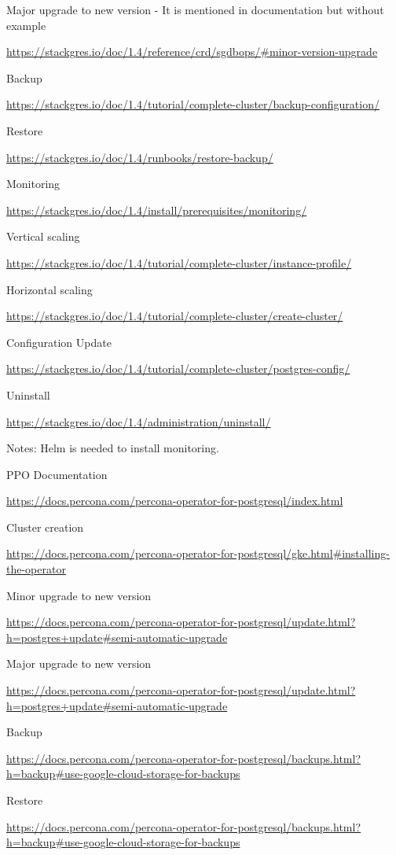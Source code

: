 Major upgrade to new version - It is mentioned in documentation but without example

\url{https://stackgres.io/doc/1.4/reference/crd/sgdbops/#minor-version-upgrade}

Backup

\url{https://stackgres.io/doc/1.4/tutorial/complete-cluster/backup-configuration/}

Restore

\url{https://stackgres.io/doc/1.4/runbooks/restore-backup/}

Monitoring

\url{https://stackgres.io/doc/1.4/install/prerequisites/monitoring/}

Vertical scaling

\url{https://stackgres.io/doc/1.4/tutorial/complete-cluster/instance-profile/}

Horizontal scaling

\url{https://stackgres.io/doc/1.4/tutorial/complete-cluster/create-cluster/}

Configuration Update

\url{https://stackgres.io/doc/1.4/tutorial/complete-cluster/postgres-config/}

Uninstall

\url{https://stackgres.io/doc/1.4/administration/uninstall/}

Notes: Helm is needed to install monitoring.

PPO
Documentation

\url{https://docs.percona.com/percona-operator-for-postgresql/index.html}

Cluster creation

\url{https://docs.percona.com/percona-operator-for-postgresql/gke.html#installing-the-operator}

Minor upgrade to new version

\url{https://docs.percona.com/percona-operator-for-postgresql/update.html?h=postgres+update#semi-automatic-upgrade}

Major upgrade to new version

\url{https://docs.percona.com/percona-operator-for-postgresql/update.html?h=postgres+update#semi-automatic-upgrade}

Backup

\url{https://docs.percona.com/percona-operator-for-postgresql/backups.html?h=backup#use-google-cloud-storage-for-backups}

Restore

\url{https://docs.percona.com/percona-operator-for-postgresql/backups.html?h=backup#use-google-cloud-storage-for-backups}

